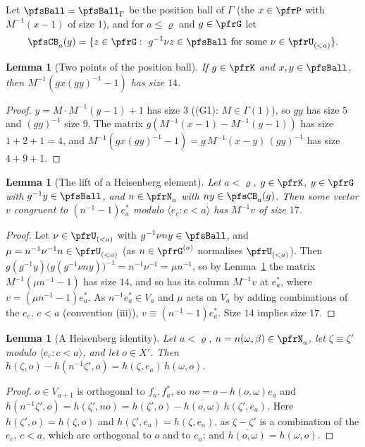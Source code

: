 \documentclass[10pt]{amsart}
\newtheorem{lemma}[theorem]{Lemma}
\theoremstyle{definition}
\theoremstyle{remark}
\begin{document}
Let $\pfsBall=\pfsBall_\Gamma$ be the position ball of $\Gamma$ (the $x\in\pfrP$ with $M^{-1}(x-1)$ of size $1$),
and for $a\le\varrho$ and $g\in\pfrG$ let
\[
\pfsCB_a(g)=\{z\in\pfrG:\ g^{-1}\nu z\in\pfsBall\text{ for some }\nu\in\pfrU_{(<a)}\}.
\]

\begin{lemma}[Two points of the position ball]\label{pfs:twopos}
If $g\in\pfrK$ and $x,y\in\pfsBall$, then $M^{-1}(gx(gy)^{-1}-1)$ has size $14$.
\end{lemma}
\begin{proof}
$y=M\cdot M^{-1}(y-1)+1$ has size $3$ ((G1): $M\in\Gamma(1)$), so $gy$ has size $5$ and $(gy)^{-1}$ size $9$. The
matrix $g(M^{-1}(x-1)-M^{-1}(y-1))$ has size $1+2+1=4$, and $M^{-1}(gx(gy)^{-1}-1)=g\,M^{-1}(x-y)\,(gy)^{-1}$ has size
$4+9+1$.
\end{proof}

\begin{lemma}[The lift of a Heisenberg element]\label{pfs:lift}
Let $a<\varrho$, $g\in\pfrK$, $y\in\pfrG$ with $g^{-1}y\in\pfsBall$, and $n\in\pfrN_a$ with $ny\in\pfsCB_a(g)$. Then
some vector $v$ congruent to $(n^{-1}-1)e_a^*$ modulo $\langle e_c:c<a\rangle$ has $M^{-1}v$ of size $17$.
\end{lemma}
\begin{proof}
Let $\nu\in\pfrU_{(<a)}$ with $g^{-1}\nu ny\in\pfsBall$, and $\mu=n^{-1}\nu^{-1}n\in\pfrU_{(<a)}$ (as $n\in\pfrG^{(a)}$
normalises $\pfrU_{(<a)}$). Then $g(g^{-1}y)\bigl(g(g^{-1}\nu ny)\bigr)^{-1}=n^{-1}\nu^{-1}=\mu n^{-1}$, so by
Lemma~\ref{pfs:twopos} the matrix $M^{-1}(\mu n^{-1}-1)$ has size $14$, and so has its column $M^{-1}v$ at $e_a^*$, where
$v=(\mu n^{-1}-1)e_a^*$. As $n^{-1}e_a^*\in V_a$ and $\mu$ acts on
$V_a$ by adding combinations of the $e_c$, $c<a$ (convention (iii)), $v\equiv(n^{-1}-1)e_a^*$. Size $14$ implies
size $17$.
\end{proof}

\begin{lemma}[A Heisenberg identity]\label{pfs:heisid}
Let $a<\varrho$, $n=n(\omega,\beta)\in\pfrN_a$, let $\zeta\equiv\zeta'$ modulo $\langle e_c:c<a\rangle$, and let $o\in X'$.
Then $h(\zeta,o)-h(n^{-1}\zeta',o)=h(\zeta,e_a)\,h(\omega,o)$.
\end{lemma}
\begin{proof}
$o\in V_{a+1}$ is orthogonal to $f_a,f_a^*$, so $no=o-h(o,\omega)e_a$ and $h(n^{-1}\zeta',o)=h(\zeta',no)=h(\zeta',o)-
\overline{h(o,\omega)}\,h(\zeta',e_a)$. Here $h(\zeta',o)=h(\zeta,o)$ and $h(\zeta',e_a)=h(\zeta,e_a)$, as $\zeta-\zeta'$ is a
combination of the $e_c$, $c<a$, which are orthogonal to $o$ and to $e_a$; and $\overline{h(o,\omega)}=h(\omega,o)$.
\end{proof}
\end{document}
